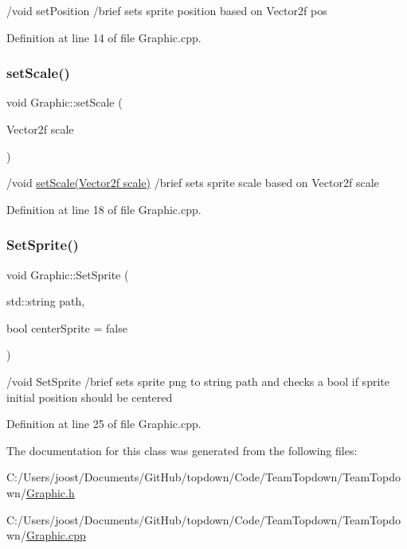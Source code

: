 /void set\+Position /brief sets sprite position based on Vector2f pos 

Definition at line 14 of file Graphic.\+cpp.

\mbox{\label{class_graphic_a681124d0e87f6e8d14211195c4832880}} 
\subsubsection{\texorpdfstring{set\+Scale()}{setScale()}}
{\footnotesize\ttfamily void Graphic\+::set\+Scale (\begin{DoxyParamCaption}\item[{Vector2f}]{scale }\end{DoxyParamCaption})}

/void \hyperlink{class_graphic_a681124d0e87f6e8d14211195c4832880}{set\+Scale(\+Vector2f scale)} /brief sets sprite scale based on Vector2f scale 

Definition at line 18 of file Graphic.\+cpp.

\mbox{\label{class_graphic_a33969eb4051f1f51c67bf2e8d0959f2d}} 
\subsubsection{\texorpdfstring{Set\+Sprite()}{SetSprite()}}
{\footnotesize\ttfamily void Graphic\+::\+Set\+Sprite (\begin{DoxyParamCaption}\item[{std\+::string}]{path,  }\item[{bool}]{center\+Sprite = {\ttfamily false} }\end{DoxyParamCaption})}

/void Set\+Sprite /brief sets sprite png to string path and checks a bool if sprite initial position should be centered 

Definition at line 25 of file Graphic.\+cpp.



The documentation for this class was generated from the following files\+:\begin{DoxyCompactItemize}
\item 
C\+:/\+Users/joost/\+Documents/\+Git\+Hub/topdown/\+Code/\+Team\+Topdown/\+Team\+Topdown/\hyperlink{_graphic_8h}{Graphic.\+h}\item 
C\+:/\+Users/joost/\+Documents/\+Git\+Hub/topdown/\+Code/\+Team\+Topdown/\+Team\+Topdown/\hyperlink{_graphic_8cpp}{Graphic.\+cpp}\end{DoxyCompactItemize}
